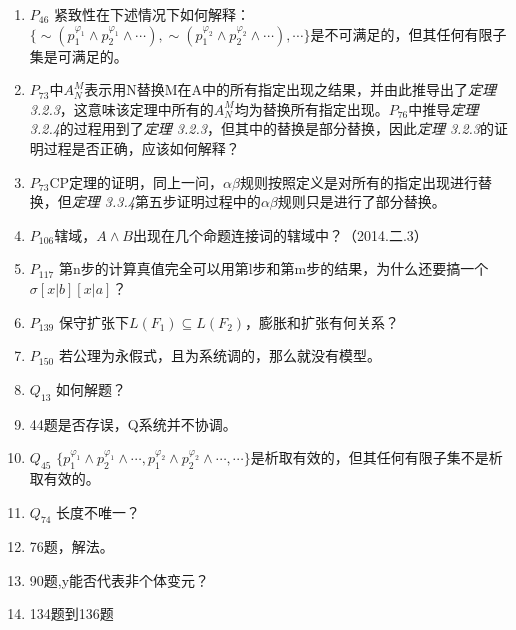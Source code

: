 \documentclass[a4paper]{ctexart}
\begin{document}
\begin{enumerate}
  
  \item $P_{46}$ 紧致性在下述情况下如何解释：
  $\{\sim(p_1^{\varphi_1}\wedge p_2^{\varphi_1}\wedge\cdots),\sim(p_1^{\varphi_2}\wedge p_2^{\varphi_2}\wedge\cdots),\cdots\}$是不可满足的，但其任何有限子集是可满足的。

  \item $P_{73}$中$A_N^M$表示用N替换M在A中的所有指定出现之结果，并由此推导出了\textit{定理 3.2.3}，这意味该定理中所有的$A_N^M$均为替换所有指定出现。$P_{76}$中推导\textit{定理 3.2.4}的过程用到了\textit{定理 3.2.3}，但其中的替换是部分替换，因此\textit{定理 3.2.3}的证明过程是否正确，应该如何解释？
  
  \item $P_{73}$CP定理的证明，同上一问，$\alpha\beta$规则按照定义是对所有的指定出现进行替换，但\textit{定理 3.3.4}第五步证明过程中的$\alpha\beta$规则只是进行了部分替换。
  
  \item $P_{106}$辖域，$A\wedge B$出现在几个命题连接词的辖域中？（2014.二.3）
  
  \item $P_{117}$ 第n步的计算真值完全可以用第l步和第m步的结果，为什么还要搞一个$\sigma[x|b][x|a]$？
  
  \item $P_{139}$ 保守扩张下$L(F_1)\subseteq L(F_2)$，膨胀和扩张有何关系？
  
  \item $P_{150}$ 若公理为永假式，且为系统调的，那么就没有模型。
  
  
  \item $Q_{13}$ 如何解题？   
  
  \item 44题是否存误，Q系统并不协调。
  
  \item $Q_{45}$ $\{p_1^{\varphi_1}\wedge p_2^{\varphi_1}\wedge\cdots,p_1^{\varphi_2}\wedge p_2^{\varphi_2}\wedge\cdots,\cdots\}$是析取有效的，但其任何有限子集不是析取有效的。
   
  \item $Q_{74}$ 长度不唯一？
  
  \item 76题，解法。
   
  \item 90题,y能否代表非个体变元？ 
  
  \item 134题到136题
   

\end{enumerate}
\end{document}
